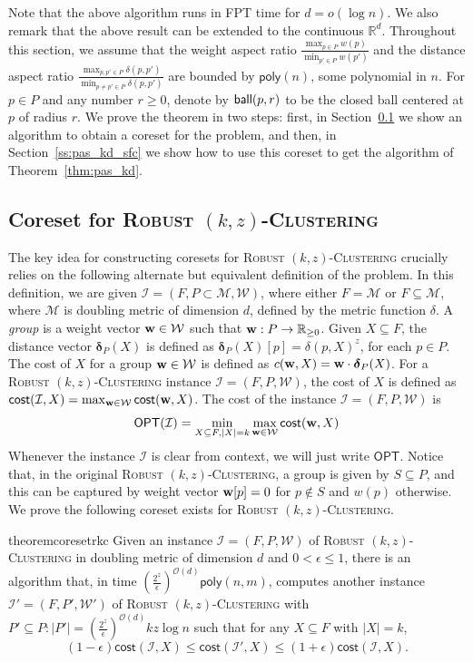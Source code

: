 \documentclass[11pt]{article}
\newcommand{\opt}{\ensuremath{\textsf{OPT}}}
\newcommand{\cost}{\ensuremath{\textsf{cost}}}
\newcommand{\poly}{\ensuremath{\textsf{poly}}}
\newcommand{\abs}[1]{\ensuremath{|#1|}}
\newcommand{\ball}{{\sf ball}}
\newcommand{\fpt}{\textsf{FPT}\xspace}
\newcommand{\rkc}{\textsc{Robust $(k,z)$-Clustering}\xspace}
\newcommand{\bigO}[1]{\ensuremath{\mathcal{O}\left(#1\right)}}
\newcommand{\vecw}{{\bf w}\xspace}
\newcommand{\vecd}{{\boldsymbol{\delta}}}
\newcommand{\cI}{\ensuremath{\mathcal{I}}\xspace}
\newcommand{\cM}{\ensuremath{\mathcal{M}}\xspace}
\newcommand{\cW}{\ensuremath{\mathcal{W}}\xspace}
\begin{document}
\epasdoubling*

Note that the above algorithm runs in \fpt time for $d=o(\log n)$.
We also remark that the above result can be extended to the continuous $\mathbb{R}^d$.
Throughout this section, we assume that the weight aspect ratio $\frac{\max_{p \in P} w(p)}{\min_{p' \in P} w(p')}$ and the distance aspect ratio $\frac{\max_{p,p' \in P} \delta(p,p')}{\min_{p\ne p' \in P} \delta(p,p')}$ are bounded by $\poly(n)$, some polynomial in $n$.
For $p\in P$ and any number $r \ge 0$, denote by $\ball(p,r)$ to be the closed ball centered at $p$ of radius $r$.
We prove the theorem in two steps: first, in Section~\ref{ss:coreset_sfc} we show an algorithm to obtain a  coreset for the problem, and then, in Section~\ref{ss:pas_kd_sfc} we show how to use this coreset to get the algorithm of Theorem~\ref{thm:pas_kd}. 

    
\subsection{Coreset for \rkc} \label{ss:coreset_sfc}
The key idea for constructing coresets for \rkc crucially relies on the following alternate but equivalent definition of the problem. In this definition, we are given $\cI=(F, P\subset \cM,\cW)$, where either $F=\cM$ or $F\subseteq \cM$, where $\cM$ is doubling metric of dimension $d$, defined by the metric function $\delta$.
A \emph{group} is a  weight vector $\vecw \in \cW$ such that $\vecw: P \rightarrow \mathbb{R}_{\geq 0}$. 
Given $X \subseteq F$, the distance vector $\vecd_{P}(X)$ is defined as ${\vecd }_{P}(X)[p] = \delta(p,X)^z$, for each $p \in P$. 
The cost of $X$ for a group $\vecw \in \cW$ is defined as $c(\vecw, X) = \vecw \cdot \vecd_P(X)$.
For  a \rkc instance $\cI= (F,P,\cW)$, the cost of $X$ is defined as $\cost(\cI,X) = \max_{\vecw \in \cW}\cost(\vecw,X)$.
The cost of the  instance $\cI= (F,P,\cW)$ is 
\[\opt(\cI) = \min_{X \subseteq F, |X|=k} \max_{\vecw \in \cW} \cost(\vecw,X) 
\] 
Whenever the instance $\cI$ is clear from context, we will just write $\opt$. 
Notice that, in the original \rkc, a group is given by $S \subseteq P$, and this can be captured by weight vector $\vecw[p] = 0$ for $p \not \in S$ and $w(p)$ otherwise. We prove the following coreset exists for  \rkc.

\begin{restatable}[Coreset for \rkc]{theorem}{coresetrkc}
\label{thm: coresetrobust}
Given an instance $\cI=(F,P,\cW)$ of \rkc in doubling metric of dimension $d$ and $0 < \epsilon \le 1$, there is an algorithm that, in time $\left(\frac{2^z}{\epsilon}\right)^{\bigO{d}}\poly(n,m)$, computes another instance  $\cI'=(F,P',\cW')$ of \rkc with $P' \subseteq P: |P'|= \left(\frac{2^z}{\epsilon}\right)^{\bigO{d}} kz\log n$ such that for any $X \subseteq F$ with $\abs{X} = k$,
\[(1-\epsilon) \cost(\cI,X) \le \cost(\cI',X)  \le (1+\epsilon) \cost(\cI,X). \]

\end{restatable}
\end{document}
